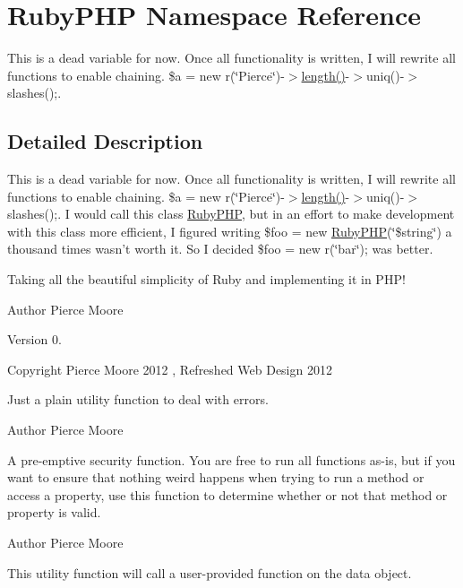 \hypertarget{namespace_ruby_p_h_p}{\section{Ruby\-P\-H\-P Namespace Reference}
\label{namespace_ruby_p_h_p}
}


This is a dead variable for now. Once all functionality is written, I will rewrite all functions to enable chaining. \$a = new r(\char`\"{}\-Pierce\char`\"{})-\/$>$\hyperlink{index_8php_a328bd7d697cc1b3dfd1859d35420f2d0}{length()}-\/$>$uniq()-\/$>$slashes();.  




\subsection{Detailed Description}
This is a dead variable for now. Once all functionality is written, I will rewrite all functions to enable chaining. \$a = new r(\char`\"{}\-Pierce\char`\"{})-\/$>$\hyperlink{index_8php_a328bd7d697cc1b3dfd1859d35420f2d0}{length()}-\/$>$uniq()-\/$>$slashes();. I would call this class \hyperlink{namespace_ruby_p_h_p}{Ruby\-P\-H\-P}, but in an effort to make development with this class more efficient, I figured writing \$foo = new \hyperlink{namespace_ruby_p_h_p}{Ruby\-P\-H\-P}(\char`\"{}\$string\char`\"{}) a thousand times wasn't worth it. So I decided \$foo = new r(\char`\"{}bar\char`\"{}); was better.

Taking all the beautiful simplicity of Ruby and implementing it in P\-H\-P! \begin{DoxyAuthor}{Author}
Pierce Moore 
\end{DoxyAuthor}
\begin{DoxyVersion}{Version}
0. 
\end{DoxyVersion}
\begin{DoxyCopyright}{Copyright}
Pierce Moore 2012 , Refreshed Web Design 2012
\end{DoxyCopyright}
Just a plain utility function to deal with errors.

\begin{DoxyAuthor}{Author}
Pierce Moore
\end{DoxyAuthor}
A pre-\/emptive security function. You are free to run all functions as-\/is, but if you want to ensure that nothing weird happens when trying to run a method or access a property, use this function to determine whether or not that method or property is valid.

\begin{DoxyAuthor}{Author}
Pierce Moore
\end{DoxyAuthor}
This utility function will call a user-\/provided function on the data object.

